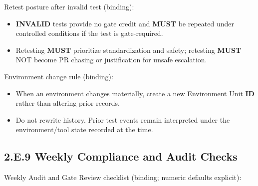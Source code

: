\documentclass[10pt]{article}
\begin{document}
Retest posture after invalid test (binding):

\begin{itemize}
\item \textbf{INVALID} tests provide no gate credit and \textbf{MUST} be repeated under controlled conditions if the test is gate-required.
\item Retesting \textbf{MUST} prioritize standardization and safety; retesting \textbf{MUST} NOT become PR chasing or justification for unsafe escalation.
\end{itemize}

Environment change rule (binding):

\begin{itemize}
\item When an environment changes materially, create a new Environment Unit \textbf{ID} rather than altering prior records.
\item Do not rewrite history. Prior test events remain interpreted under the environment/tool state recorded at the time.
\end{itemize}

\newpage

\subsection*{2.E.9 Weekly Compliance and Audit Checks}
{}

Weekly Audit and Gate Review checklist (binding; numeric defaults explicit):
\end{document}
